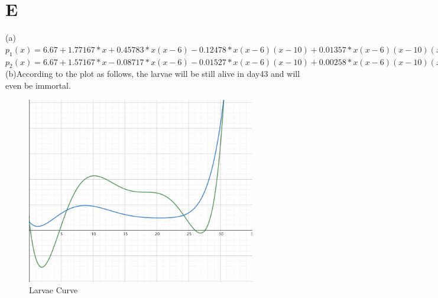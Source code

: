 \documentclass[UTF8]{ctexart}
\begin{document}
\section*{E}
(a)$p_1(x) = 6.67+1.77167*x+0.45783*x(x-6)-0.12478*x(x-6)(x-10)+0.01357*x(x-6)(x-10)(x-13)-0.00098*x(x-6)(x-10)(x-13)(x-17)+0.00004*x(x-6)(x-10)(x-13)(x-17)(x-20)$\\
$p_2(x) = 6.67+1.57167*x-0.08717*x(x-6)-0.01527*x(x-6)(x-10)+0.00258*x(x-6)(x-10)(x-13)-0.00020*x(x-6)(x-10)(x-13)(x-17)+0.00001*x(x-6)(x-10)(x-13)(x-17)(x-20)$\\
(b)According to the plot as follows, the larvae will be still alive in day43 and will even be immortal.
\begin{figure}[htp]
    \centering
    \includegraphics[width=10cm]{PlotE}
    \caption{Larvae Curve}
    \label{fig:PlotE}
\end{figure}
\end{document}
